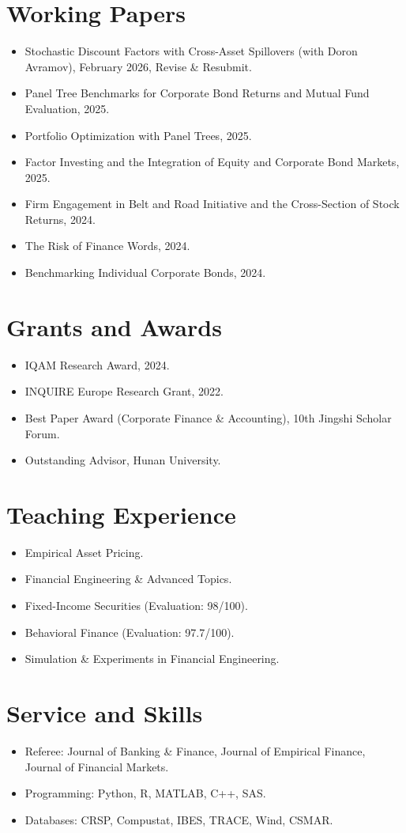 \documentclass[11pt,a4paper]{article}
\begin{document}
\section*{Working Papers}
\begin{itemize}[leftmargin=*]
    \item Stochastic Discount Factors with Cross-Asset Spillovers (with Doron Avramov), February 2026, Revise \& Resubmit.
    \item Panel Tree Benchmarks for Corporate Bond Returns and Mutual Fund Evaluation, 2025.
    \item Portfolio Optimization with Panel Trees, 2025.
    \item Factor Investing and the Integration of Equity and Corporate Bond Markets, 2025.
    \item Firm Engagement in Belt and Road Initiative and the Cross-Section of Stock Returns, 2024.
    \item The Risk of Finance Words, 2024.
    \item Benchmarking Individual Corporate Bonds, 2024.
\end{itemize}

\section*{Grants and Awards}
\begin{itemize}[leftmargin=*]
    \item IQAM Research Award, 2024.
    \item INQUIRE Europe Research Grant, 2022.
    \item Best Paper Award (Corporate Finance \& Accounting), 10th Jingshi Scholar Forum.
    \item Outstanding Advisor, Hunan University.
\end{itemize}

\section*{Teaching Experience}
\begin{itemize}[leftmargin=*]
    \item Empirical Asset Pricing.
    \item Financial Engineering \& Advanced Topics.
    \item Fixed-Income Securities (Evaluation: 98/100).
    \item Behavioral Finance (Evaluation: 97.7/100).
    \item Simulation \& Experiments in Financial Engineering.
\end{itemize}

\section*{Service and Skills}
\begin{itemize}[leftmargin=*]
    \item Referee: Journal of Banking \& Finance, Journal of Empirical Finance, Journal of Financial Markets.
    \item Programming: Python, R, MATLAB, C++, SAS.
    \item Databases: CRSP, Compustat, IBES, TRACE, Wind, CSMAR.
\end{itemize}
\end{document}
